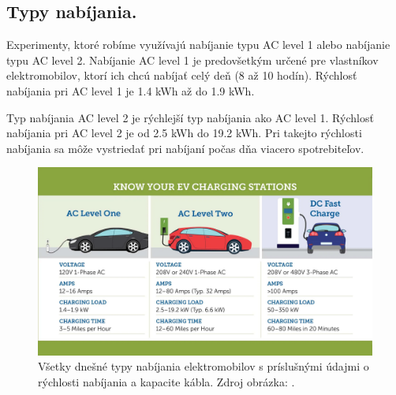 
\subsection{Typy nabíjania.}
Experimenty, ktoré robíme využívajú nabíjanie typu AC level 1 alebo nabíjanie typu AC level 2. Nabíjanie AC level 1 je predovšetkým určené pre vlastníkov elektromobilov, ktorí ich chcú nabíjať celý deň (8 až 10 hodín). Rýchlosť nabíjania pri AC level 1 je 1.4 kWh až do 1.9 kWh. 

Typ nabíjania AC level 2 je rýchlejší typ nabíjania ako AC level 1. Rýchlosť nabíjania pri AC level 2 je od 2.5 kWh do 19.2 kWh. Pri takejto rýchlosti nabíjania sa môže vystriedať pri nabíjaní počas dňa viacero spotrebiteľov. 
\cite{websitecharginglevels2023}

\begin{figure}[H]
    \includegraphics[width=1\textwidth]{images/EVCharger-Levels-jpg.png}
    \centering
    \caption[Typy nabíjania elektromobilov]{Všetky dnešné typy nabíjania elektromobilov s príslušnými údajmi o rýchlosti nabíjania a kapacite kábla. Zdroj obrázka: \cite{websitecharginglevels2023}.}
    \label{typynabijania:obr}
    \end{figure}


